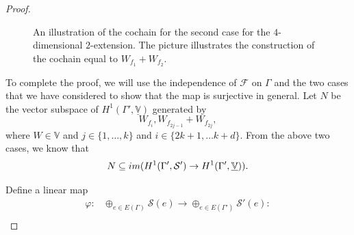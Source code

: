 \documentclass[10pt,a4paper]{amsart}
\newcommand{\im}{\textup{im}}
\begin{document}
\begin{proof}
\begin{figure}[h!]
\caption{An illustration of the cochain for the second case for the $4$-dimensional $2$-extension. The picture illustrates the construction of the cochain equal to $W_{f_1} + W_{f_2}$.}
\label{fig: proof_case_2}
\end{figure}
To complete the proof, we will use the independence of $\mathcal{F}$ on $\Gamma$ and the two cases that we have considered to show that the map is surjective in general. Let $N$ be the vector subspace of $H^{1}(\Gamma', \underline{\mathbb{V}})$ generated by 
\begin{equation*}
    W_{f_{i}}, W_{f_{2j-1}} + W_{f_{2j}},
\end{equation*}
  where $W\in \mathbb{V}$ and $j\in \{1, \dots, k\}$ and $i \in \{2k+1, \dots k + d\}$. From the above two cases, we know that
  \begin{equation*}
  N \subseteq \im(H^{1}(\Gamma', \mathcal{S}') \rightarrow H^{1}(\Gamma', \underline{\mathbb{V}})).
  \end{equation*}

Define a linear map
\begin{equation*}
\begin{array}{cl}
   \varphi: & \oplus_{e \in E(\Gamma)}  \mathcal{S}(e) \rightarrow \oplus_{e \in E(\Gamma')} \mathcal{S}'(e):\\
   

\end{array}
\end{equation*}
\end{proof}
\end{document}
